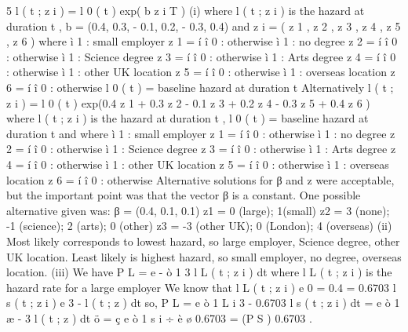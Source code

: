 \documentclass[a4paper,12pt]{article}
\begin{document}
5
l ( t ; z i ) = l 0 ( t ) exp( b z i T )
(i)
where l ( t ; z i ) is the hazard at duration t ,
b = (0.4, 0.3, - 0.1, 0.2, - 0.3, 0.4)
and
z i = ( z 1 , z 2 , z 3 , z 4 , z 5 , z 6 )
where
ì 1 : small employer
z 1 = í
î 0 : otherwise
ì 1 : no degree
z 2 = í
î 0 : otherwise
ì 1 : Science degree
z 3 = í
î 0 : otherwise
ì 1 : Arts degree
z 4 = í
î 0 : otherwise
ì 1 : other UK location
z 5 = í
î 0 : otherwise
ì 1 : overseas location
z 6 = í
î 0 : otherwise
l 0 ( t ) = baseline hazard at duration t
Alternatively
l ( t ; z i ) = l 0 ( t ) exp(0.4 z 1 + 0.3 z 2 - 0.1 z 3 + 0.2 z 4 - 0.3 z 5 + 0.4 z 6 )
where l ( t ; z i ) is the hazard at duration t ,
l 0 ( t ) = baseline hazard at duration t
and
where
ì 1 : small employer
z 1 = í
î 0 : otherwise
ì 1 : no degree
z 2 = í
î 0 : otherwise
ì 1 : Science degree
z 3 = í
î 0 : otherwise
ì 1 : Arts degree
z 4 = í
î 0 : otherwise
ì 1 : other UK location
z 5 = í
î 0 : otherwise
ì 1 : overseas location
z 6 = í
î 0 : otherwise
Alternative solutions for β and z were acceptable, but the important point was that the
vector β is a constant. One possible alternative given was:
β = (0.4, 0.1, 0.1)
z1 = 0 (large); 1(small)
z2 = 3 (none); -1 (science); 2 (arts); 0 (other)
z3 = -3 (other UK); 0 (London); 4 (overseas)
(ii)
Most likely corresponds to lowest hazard, so large employer, Science degree,
other UK location.
Least likely is highest hazard, so small employer, no degree, overseas location.
(iii)
We have
P L = e
- ò 1 3 l L ( t ; z i ) dt
where l L ( t ; z i ) is the hazard rate for a large employer
We know that
l L ( t ; z i )
e 0
= 0.4 = 0.6703
l s ( t ; z i )
e
3
- l ( t ; z ) dt
so, P L = e ò 1 L i
3
- 0.6703 l s ( t ; z i ) dt
= e ò 1
æ - 3 l ( t ; z ) dt ö
= ç e ò 1 s i ÷
è
ø
0.6703
= (P S ) 0.6703 .
\end{document}
